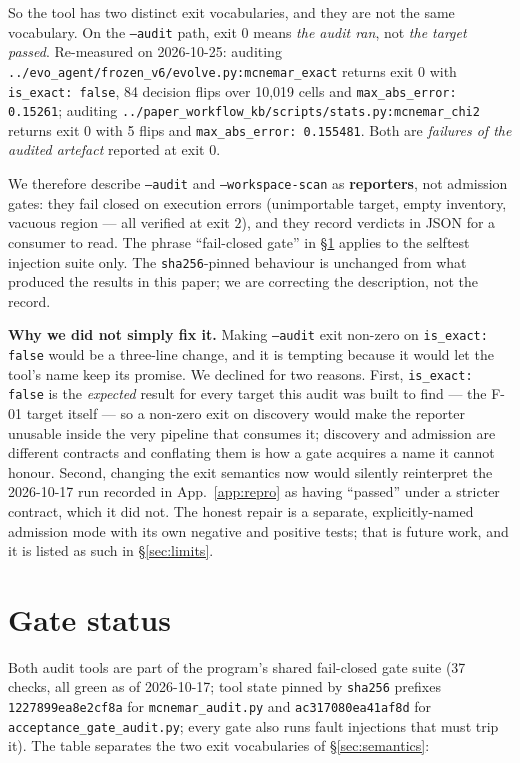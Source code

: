 \documentclass[10pt]{article}
\newcommand{\code}[1]{\texttt{#1}}
\begin{document}
So the tool has two distinct exit vocabularies, and they are not the same
vocabulary. On the \code{--audit} path, exit $0$ means \emph{the audit ran},
not \emph{the target passed}. Re-measured on 2026-10-25: auditing
\code{../evo\_agent/frozen\_v6/evolve.py:mcnemar\_exact} returns exit $0$ with
\code{is\_exact: false}, 84 decision flips over 10{,}019 cells and
\code{max\_abs\_error: 0.15261}; auditing
\code{../paper\_workflow\_kb/scripts/stats.py:mcnemar\_chi2} returns exit $0$
with 5 flips and \code{max\_abs\_error: 0.155481}. Both are \emph{failures of
the audited artefact} reported at exit $0$.

We therefore describe \code{--audit} and \code{--workspace-scan} as
\textbf{reporters}, not admission gates: they fail closed on execution
errors (unimportable target, empty inventory, vacuous region --- all verified
at exit $2$), and they record verdicts in JSON for a consumer to read. The
phrase ``fail-closed gate'' in \S\ref{sec:gates} applies to the selftest
injection suite only. The \code{sha256}-pinned behaviour is unchanged from
what produced the results in this paper; we are correcting the description,
not the record.

\noindent\textbf{Why we did not simply fix it.} Making \code{--audit} exit
non-zero on \code{is\_exact: false} would be a three-line change, and it is
tempting because it would let the tool's name keep its promise. We declined
for two reasons. First, \code{is\_exact: false} is the \emph{expected} result
for every target this audit was built to find --- the F-01 target itself ---
so a non-zero exit on discovery would make the reporter unusable inside the
very pipeline that consumes it; discovery and admission are different
contracts and conflating them is how a gate acquires a name it cannot honour.
Second, changing the exit semantics now would silently reinterpret the
2026-10-17 run recorded in App.~\ref{app:repro} as having ``passed'' under a
stricter contract, which it did not. The honest repair is a separate,
explicitly-named admission mode with its own negative and positive tests;
that is future work, and it is listed as such in \S\ref{sec:limits}.

\section{Gate status}\label{sec:gates}

Both audit tools are part of the program's shared fail-closed gate suite
(37 checks, all green as of 2026-10-17; tool state pinned by
\code{sha256} prefixes \code{1227899ea8e2cf8a} for \code{mcnemar\_audit.py}
and \code{ac317080ea41af8d} for \code{acceptance\_gate\_audit.py}; every gate
also runs fault injections that must trip it). The table separates the two
exit vocabularies of \S\ref{sec:semantics}:
\end{document}
